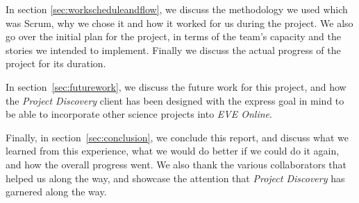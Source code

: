 In section \ref{sec:workscheduleandflow}, we discuss the methodology we used which was Scrum, why we chose it and how it worked for us during the project. We also go over the initial plan for the project, in terms of the team's capacity and the stories we intended to implement. Finally we discuss the actual progress of the project for its duration.

In section~\ref{sec:futurework}, we discuss the future work for this project, and how the \emph{Project Discovery} client has been designed with the express goal in mind to be able to incorporate other science projects into \emph{EVE Online}.

Finally, in section~\ref{sec:conclusion}, we conclude this report, and discuss what we learned from this experience, what we would do better if we could do it again, and how the overall progress went. We also thank the various collaborators that helped us along the way, and showcase the attention that \emph{Project Discovery} has garnered along the way.
